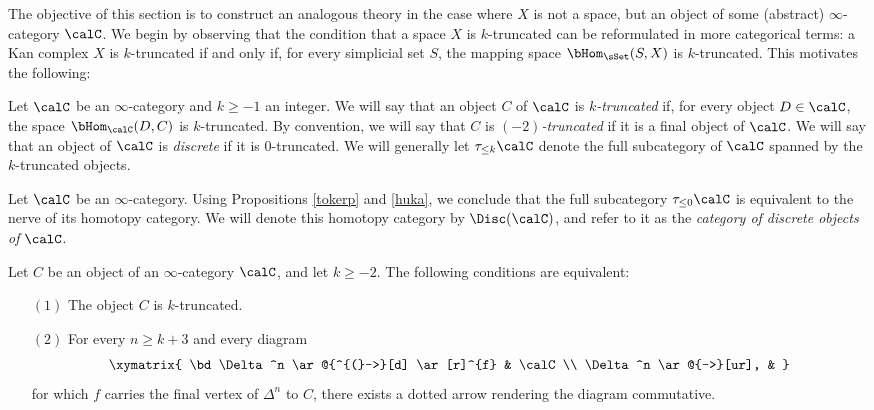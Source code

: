 The objective of this section is to construct an analogous theory in the case where $X$ is not a space, but an object of some (abstract) $\infty$-category $\calC$. We begin by observing that the condition that a space $X$ is $k$-truncated can be reformulated in more categorical terms:
a Kan complex $X$ is $k$-truncated if and only if, for every simplicial set $S$, the mapping space
$\bHom_{\sSet}(S,X)$ is $k$-truncated. This motivates the following:

\begin{definition}\label{tooka}
Let $\calC$ be an $\infty$-category and $k \geq -1$ an integer. We will say that an object
$C$ of $\calC$ is {\it $k$-truncated} if, for every object $D \in \calC$, the
space $\bHom_{\calC}(D,C)$ is $k$-truncated. By convention, we will say that $C$ is {\it $(-2)$-truncated} if it is a final object of $\calC$. We will say that an object of $\calC$ is {\it discrete} if it is $0$-truncated. We will generally let $\tau_{\leq k} \calC$ denote the full subcategory of $\calC$ spanned by the $k$-truncated objects.
\end{definition}

\begin{notation}
Let $\calC$ be an $\infty$-category. Using Propositions \ref{tokerp} and \ref{huka}, we conclude that the full subcategory $\tau_{\leq 0} \calC$ is equivalent to the nerve of its homotopy category. We will denote this homotopy category by $\Disc(\calC)$, and refer to it as the {\it category of discrete objects of $\calC$}.
\end{notation}

\begin{lemma}
Let $C$ be an object of an $\infty$-category $\calC$, and let $k \geq -2$. The following conditions
are equivalent:
\begin{itemize}
\item[$(1)$] The object $C$ is $k$-truncated.
\item[$(2)$] For every $n \geq k+3$ and every diagram
$$ \xymatrix{ \bd \Delta^n \ar@{^{(}->}[d] \ar[r]^{f} & \calC \\
\Delta^n \ar@{-->}[ur], & }$$ for which $f$ carries the final vertex of $\Delta^n$ to
$C$, there exists a dotted arrow rendering the diagram commutative.
\end{itemize}
\end{lemma}

